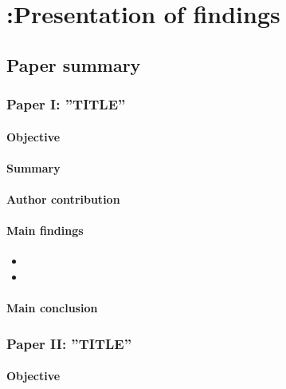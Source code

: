 \chapter[Presentation of findings]{{\color{red} :}Presentation of findings}
%
\label{ch:findings}
%

\section{Paper summary}\label{sec:paper:summary}



\subsection{Paper I: ''TITLE''}
\subsubsection{Objective}
\kant[10]
\subsubsection{Summary}
\kant[10]
\subsubsection{Author contribution}
\kant[10]

\subsubsection{Main findings}
\kant[10]
\begin{itemize}
\item \kant[11]
\item \kant[12]
\end{itemize}

\subsubsection{Main conclusion}
 \kant[13]

\newpage
\subsection{Paper II: ''TITLE''}

\subsubsection{Objective}
\kant[10]
